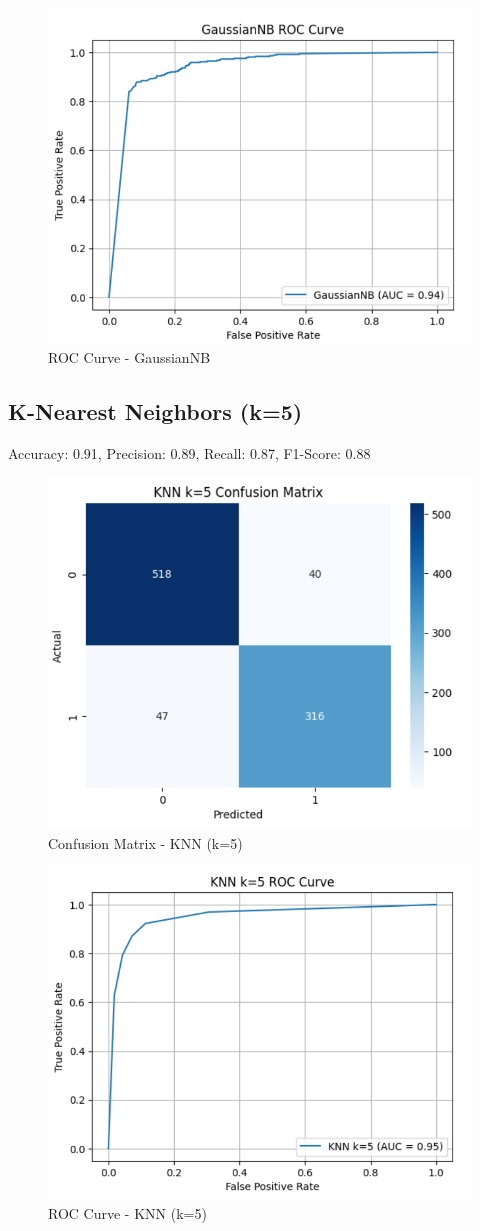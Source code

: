\documentclass[12pt]{article}
\begin{document}
\begin{figure}[H]
    \centering
    \includegraphics[width=0.6\linewidth]{image4.png}
    \caption{ROC Curve - GaussianNB}
\end{figure}

\subsection*{K-Nearest Neighbors (k=5)}
Accuracy: 0.91, Precision: 0.89, Recall: 0.87, F1-Score: 0.88

\begin{figure}[H]
    \centering
    \includegraphics[width=0.5\linewidth]{image5.png}
    \caption{Confusion Matrix - KNN (k=5)}
\end{figure}

\begin{figure}[H]
    \centering
    \includegraphics[width=0.6\linewidth]{image6.png}
    \caption{ROC Curve - KNN (k=5)}
\end{figure}
\end{document}
